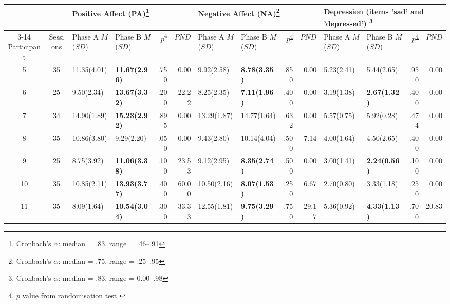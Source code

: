 \begin{sidewaystable}[!htbp]
\centering
\caption{Randomisation tests and meta-analysis for positive affect (PA), negative affect (NA) and depression. Values in \textbf{bold} indicate changes in hypothesised direction.} 
\label{tab:panas}
{\scriptsize
\begin{tabular}{ccllrr@{\hspace{2em}}llrr@{\hspace{2em}}llrr}
  \toprule 
 & &  \multicolumn{4}{l}{Positive Affect (PA)\footnote{Cronbach's $\alpha$: median = .83, range = .46--.91}}  &  \multicolumn{4}{l}{Negative Affect (NA)\footnote{Cronbach's $\alpha$: median = .75, range = .25--.95}}  &  \multicolumn{4}{l}{Depression (items 'sad' and 'depressed') \footnote{Cronbach's $\alpha$: median = .83, range = 0.00--.98}} \\
 \cline{3-14} 
 Participant & Sessions & Phase A ${M}$(${SD}$) & Phase B ${M}$(${SD}$)
					  &  ${p}$\footnote{\label{randp1}${p}$ value from randomisation test \parencite{bulte_r_2008}} & ${PND}$ & Phase A ${M}$(${SD}$) & Phase B
					  ${M}$(${SD}$) &  ${p}$\textsuperscript{\ref{randp1}} & ${PND}$ & Phase A ${M}$(${SD}$) &
					  Phase B ${M}$(${SD}$) &  ${p}$\textsuperscript{\ref{randp1}}  & ${PND}$\\
 \midrule 
 5 & 35 & 11.35(4.01) & \textbf{11.67(2.96)} & .750 & 0.00 & 9.92(2.58) & \textbf{8.78(3.35)} & .850 & 0.00 & 5.23(2.41) & 5.44(2.65) & .950 & 0.00 \\ 
  6 & 25 & 9.50(2.34) & \textbf{13.67(3.32)} & .200 & 22.22 & 8.25(2.35) & \textbf{7.11(1.96)} & .400 & 0.00 & 3.19(1.38) & \textbf{2.67(1.32)} & .400 & 0.00 \\ 
  7 & 34 & 14.90(1.89) & \textbf{15.23(2.92)} & .895 & 0.00 & 13.29(1.87) & 14.77(1.64) & .632 & 0.00 & 5.57(0.75) & 5.92(0.28) & .474 & 0.00 \\ 
  8 & 35 & 10.86(3.80) & 9.29(2.20) & .050 & 0.00 & 9.43(2.80) & 10.14(4.04) & .500 & 7.14 & 4.00(1.64) & 4.50(2.65) & .400 & 0.00 \\ 
  9 & 25 & 8.75(3.92) & \textbf{11.06(3.38)} & .100 & 23.53 & 9.12(2.95) & \textbf{8.35(2.74)} & .500 & 0.00 & 3.00(1.41) & \textbf{2.24(0.56)} & .100 & 0.00 \\ 
  10 & 35 & 10.85(2.11) & \textbf{13.93(3.77)} & .400 & 60.00 & 10.50(2.16) & \textbf{8.07(1.53)} & .250 & 6.67 & 2.70(0.80) & 3.33(1.18) & .250 & 0.00 \\ 
  11 & 35 & 8.09(1.64) & \textbf{10.54(3.04)} & .300 & 33.33 & 12.55(1.81) & \textbf{9.75(3.29)} & .750 & 29.17 & 5.36(0.92) & \textbf{4.33(1.13)} & .700 & 20.83 \\ 

\end{tabular}}
\end{sidewaystable}
